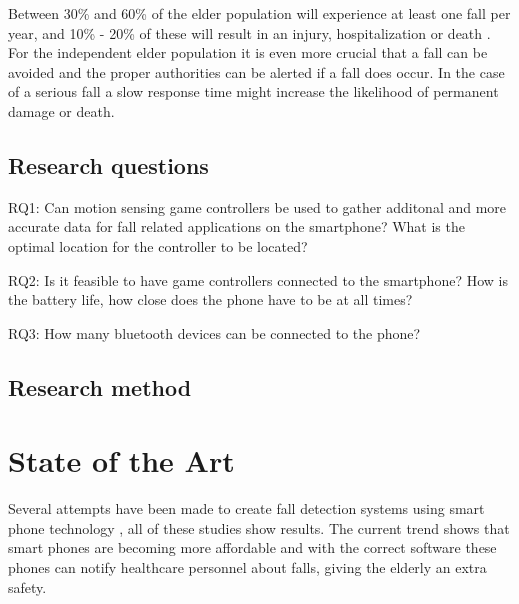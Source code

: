 \documentclass[11pt,twoside,a4paper]{report}
\begin{document}
Between 30\% and 60\% of the elder population will experience at least one fall per year, and 10\% - 20\% of these will result in an injury, hospitalization or death \cite{fallStatistics}. For the independent elder population it is even more crucial that a fall can be avoided and the proper authorities can be alerted if a fall does occur. In the case of a serious fall a slow response time might increase the likelihood of permanent damage or death\cite{personHomeDeath, dangerousFallHome}. 


\section{Research questions}
RQ1: Can motion sensing game controllers be used to gather additonal and more accurate data for fall related applications on the smartphone? What is the optimal location for the controller to be located?

RQ2: Is it feasible to have game controllers connected to the smartphone? How is the battery life, how close does the phone have to be at all times?

RQ3: How many bluetooth devices can be connected to the phone?

\section{Research method}



\chapter{State of the Art}

Several attempts have been made to create fall detection systems using smart phone technology \cite{iFall, semiSupervisedFallDetection, mobilePhoneBasedFallDetection, detectionOfFalls}, all of these studies show  results. The current trend shows that smart phones are becoming more affordable \cite{find_some_data_here} and with the correct software these phones can notify healthcare personnel about falls, giving the elderly an extra safety.
\end{document}
